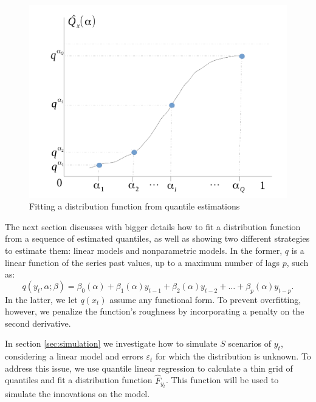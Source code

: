 \begin{figure}[h]
\centering
\includegraphics[width=0.7\linewidth]{Figuras/grafico-quantis-fx}
\caption{Fitting a distribution function from quantile estimations}
\label{fig:grafico-quantis-fx}
\end{figure}

The next section discusses with bigger details how to fit a distribution function from a sequence of estimated quantiles, as well as showing two different strategies to estimate them: linear models and nonparametric models. In the former, $q$ is a linear function of the series past values, up to a maximum number of lags $p$, such as:
\begin{equation}
q(y_t, \alpha; \beta) = \beta_0(\alpha) + \beta_1(\alpha)y_{t-1} + \beta_2(\alpha)y_{t-2} + \dots + \beta_p(\alpha) y_{t-p}.
\label{eq:ft-qar}
\end{equation}
In the latter, we let $q(x_t)$ assume any functional form. To prevent overfitting, however, we penalize the function's roughness by incorporating a penalty on the second derivative.

In section \ref{sec:simulation} we investigate how to simulate $S$ scenarios of $y_t$, considering a linear model and errors $\varepsilon_t$ for which the distribution is unknown. To address this issue, we use quantile linear regression to calculate a thin grid of quantiles and fit a distribution function $\hat{F}_{y_t}$. This function will be used to simulate the innovations on the model.

